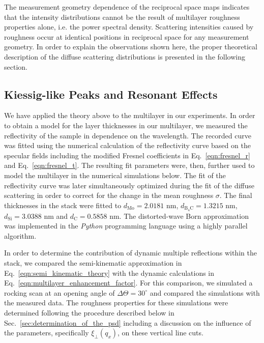 The measurement geometry dependence of the reciprocal space maps indicates that the intensity distributions cannot be the result of multilayer roughness properties alone, i.e. the power spectral density. Scattering intensities caused by roughness occur at identical positions in reciprocal space for any measurement geometry. In order to explain the observations shown here, the proper theoretical description of the diffuse scattering distributions is presented in the following section.

\subsection{Kiessig-like Peaks and Resonant Effects}
\label{sec:numerical_simulations} We have applied the theory above to the multilayer in our experiments. In order to obtain a model for the layer thicknesses in our multilayer, we measured the reflectivity of the sample in dependence on the wavelength. The recorded curve was fitted using the numerical calculation of the reflectivity curve based on the specular fields including the modified Fresnel coefficients in Eq.~\eqref{eqn:fresnel_r} and Eq.~\eqref{eqn:fresnel_t}. The resulting fit parameters were, then, further used to model the multilayer in the numerical simulations below. The fit of the reflectivity curve was later simultaneously optimized during the fit of the diffuse scattering in order to correct for the change in the mean roughness $\sigma$. The final thicknesses in the stack were fitted to $d_\text{Mo} = 2.0181$ nm, $d_\text{B$_4$C} = 1.3215$ nm, $d_\text{Si} = 3.0388$ nm and $d_\text{C} = 0.5858$ nm. The distorted-wave Born approximation was implemented in the \emph{Python} programming language using a highly parallel algorithm.

In order to determine the contribution of dynamic multiple reflections within the stack, we compared the semi-kinematic approximation in Eq.~\eqref{eqn:semi_kinematic_theory} with the dynamic calculations in Eq.~\eqref{eqn:multilayer_enhancement_factor}. For this comparison, we simulated a rocking scan at an opening angle of $\Delta \Theta = 30^\circ$ and compared the simulations with the measured data. The roughness properties for these simulations were determined following the procedure described below in Sec.~\ref{sec:determination_of_the_psd} including a discussion on the influence of the parameters, specifically $\xi_\perp(q_x)$, on these vertical line cuts.


